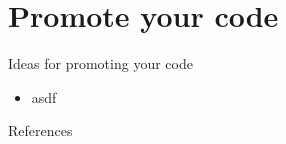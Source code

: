 \documentclass[compress,aspectratio=169]{beamer}
\begin{document}
	\section{Promote your code}
	
		\begin{frame}{Ideas for promoting your code}
		
			\begin{itemize}
				\item asdf
			
			\end{itemize}
			
		\end{frame}
	
		
		\begin{frame}{References}
			\renewcommand*{\bibfont}{\normalfont\scriptsize}
			\printbibliography[heading=none]
			\label{pg:lastpage} %
		\end{frame}
\end{document}
